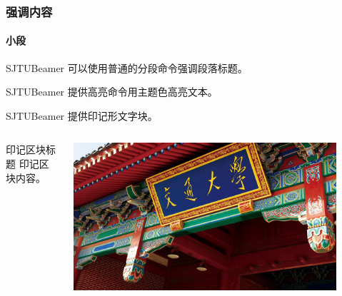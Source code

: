 \documentclass[
    aspectratio=169,  %
]{ctexbeamer}
\begin{document}
\begin{frame}
  \frametitle{强调内容}

  \paragraph{小段} SJTUBeamer 可以使用普通的分段命令强调段落标题。

   SJTUBeamer 提供高亮命令用主题色高亮文本。

   SJTUBeamer 提供印记形文字块。

  \stamphrule

  \begin{columns}
    \begin{column}{0.6\textwidth}
      \begin{stampblock}{印记区块标题}
        印记区块内容。
      \end{stampblock}
    \end{column}
    \begin{column}{0.3\textwidth}
      \begin{stampbox}
        \includegraphics[width=0.9\textwidth]{vi/sjtu-vi-sjtuphoto.jpg}
      \end{stampbox}
    \end{column}
  \end{columns}

\end{frame}
\end{document}
